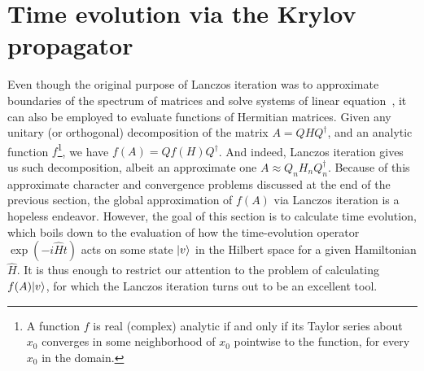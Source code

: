 \section{Time evolution via the Krylov propagator}

Even though the original purpose of Lanczos iteration was to approximate boundaries of the spectrum of matrices and
solve systems of linear equation~\autocite{Simoncini2016, Shewchuk1994}, it can also be employed to evaluate functions
of Hermitian matrices. Given any unitary (or orthogonal) decomposition of the matrix \(A = QHQ^{\dagger}\), and an analytic
function \(f\)\footnote{A function \(f\) is real (complex) analytic if and only if its Taylor series about \(x_0\)
	converges in some neighborhood of \(x_0\) pointwise to the function, for every \(x_0\) in the domain.}, we have
\(f(A) = Qf(H)Q^{\dagger}\). And indeed, Lanczos iteration gives us such decomposition, albeit an approximate one
\(A \approx Q_n H_n Q_n^{\dagger}\). Because of this approximate character and convergence problems discussed at
the end of the previous section, the global approximation of \(f(A)\) via Lanczos iteration is a hopeless endeavor.
However, the goal of this section is to calculate time evolution, which boils down to the evaluation of how the time-evolution
operator \(\exp\left(-i \hat{H} t\right) \) acts on some state \(\ket{v}\) in the Hilbert space for a given
Hamiltonian \(\hat{H}\). It is thus enough to restrict our attention to the problem of calculating \(f(A){\ket{v}}\), for
which the Lanczos iteration turns out to be an excellent tool.

